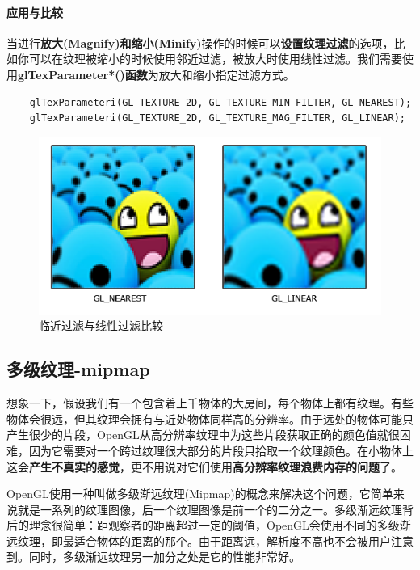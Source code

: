 \documentclass[UTF8,a4paper,12pt]{ctexbook}
\begin{document}
			
			\paragraph{应用与比较}
				当进行\textbf{放大(Magnify)和缩小(Minify)}操作的时候可以\textbf{设置纹理过滤}的选项，比如你可以在纹理被缩小的时候使用邻近过滤，被放大时使用线性过滤。我们需要使用\textbf{glTexParameter*()函数}为放大和缩小指定过滤方式。
				
				\begin{lstlisting}
	glTexParameteri(GL_TEXTURE_2D, GL_TEXTURE_MIN_FILTER, GL_NEAREST);
	glTexParameteri(GL_TEXTURE_2D, GL_TEXTURE_MAG_FILTER, GL_LINEAR);			
				\end{lstlisting}
				
				\begin{figure}[H]
					\centering
					\includegraphics[width=.9\linewidth]{texture_filtering}
					\caption{临近过滤与线性过滤比较}
				\end{figure}
			
			
		\subsection{多级纹理-mipmap}
			想象一下，假设我们有一个包含着上千物体的大房间，每个物体上都有纹理。有些物体会很远，但其纹理会拥有与近处物体同样高的分辨率。由于远处的物体可能只产生很少的片段，OpenGL从高分辨率纹理中为这些片段获取正确的颜色值就很困难，因为它需要对一个跨过纹理很大部分的片段只拾取一个纹理颜色。在小物体上这会\textbf{产生不真实的感觉}，更不用说对它们使用\textbf{高分辨率纹理浪费内存的问题}了。		
			
			OpenGL使用一种叫做多级渐远纹理(Mipmap)的概念来解决这个问题，它简单来说就是一系列的纹理图像，后一个纹理图像是前一个的二分之一。多级渐远纹理背后的理念很简单：距观察者的距离超过一定的阈值，OpenGL会使用不同的多级渐远纹理，即最适合物体的距离的那个。由于距离远，解析度不高也不会被用户注意到。同时，多级渐远纹理另一加分之处是它的性能非常好。
			
\end{document}
